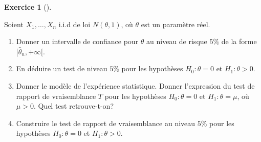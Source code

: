 \documentclass[
  10,
  letterpaper,
  DIV=11,
  numbers=noendperiod]{scrreport}
\providecommand{\tightlist}{%
  \setlength{\itemsep}{0pt}\setlength{\parskip}{0pt}}\usepackage{longtable,booktabs,array}
\theoremstyle{plain}
\theoremstyle{definition}
\newtheorem{exercise}{Exercice}[chapter]
\theoremstyle{plain}
\theoremstyle{definition}
\theoremstyle{definition}
\theoremstyle{plain}
\theoremstyle{remark}
\begin{document}
\begin{exercise}[]\protect\hypertarget{exr-testsdivers}{}\label{exr-testsdivers}

Soient \(X_1, \dotsc, X_n\) i.i.d de loi \(N(\theta,1)\), où \(\theta\)
est un paramètre réel.

\begin{enumerate}
\def\labelenumi{\arabic{enumi}.}
\tightlist
\item
  Donner un intervalle de confiance pour \(\theta\) au niveau de risque
  \(5\%\) de la forme \([\hat{\theta}_n, +\infty[\).
\item
  En déduire un test de niveau \(5\%\) pour les hypothèses
  \(H_0: \theta = 0\) et \(H_1: \theta >0\).
\item
  Donner le modèle de l'expérience statistique. Donner l'expression du
  test de rapport de vraisemblance \(T\) pour les hypothèses
  \(H_0: \theta =0\) et \(H_1: \theta = \mu\), où \(\mu >0\). Quel test
  retrouve-t-on?
\item
  Construire le test de rapport de vraisemblance au niveau \(5\%\) pour
  les hypothèses \(H_0: \theta = 0\) et \(H_1: \theta >0\).
\end{enumerate}

\end{exercise}
\end{document}
